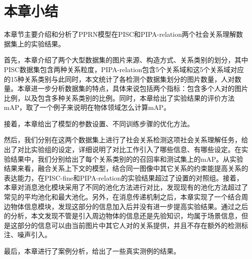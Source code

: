 \section{本章小结}

本章节主要介绍和分析了PPRN模型在PISC和PIPA-relation两个社会关系理解数据集上的实验结果。

首先，本章介绍了两个大型数据集的图片来源、构造方式、关系类别的划分，其中PISC数据集包含两种关系粒度，PIPA-relation包含5个关系域和这5个关系域对应的15种关系类别与此同时，本文统计了各检测个数据集划分的图片数量，人对数量。本章进一步分析数据集的特点，具体来说包括两个指标：包含多个人对的图片比例，以及包含多种关系类别的比例。同时，本章给出了实验结果的评价方法mAP，取了一个例子来说明在物体领域怎么计算mAP。

接着，本章给出了模型的参数设置、不同训练步骤的优化方法。

然后，我们分别在这两个数据集上进行了社会关系检测这项社会关系理解任务，给出了对比实验组的设定，详细说明了对比工作引入了哪些信息、有哪些设定。在实验结果中，我们分别给出了每个关系类别的的召回率和测试集上的mAP。从实验结果来看，融合关系上下文的模型，结合同一图像中其它关系的约束能提高关系的表达能力，在PISC-fine和PIPA-relation的实验结果超过了设置的对照组。接着，本章对消息池化模块采用了不同的池化方法进行对比，发现现有的池化方法超过了常见的平均池化和最大池化。另外，在消息传递机制之后，本章实现了一个结合周边物体信息模块，发现这部分的信息加入后并没有进一步提高实验结果。通过之后的分析，本文发现不管是引入周边物体的信息还是先验知识，均属于场景信息，但是这部分的信息可以由当前图片中其它人对的关系提供，并且不存在额外的检测标注、噪声引入。

最后，本章进行了案例分析，给出了一些真实测例的结果。


